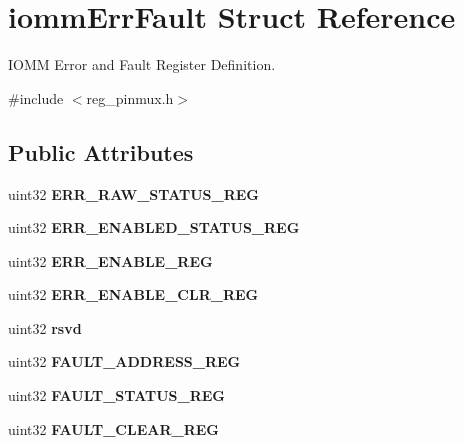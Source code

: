 \hypertarget{structiommErrFault}{}\section{iomm\+Err\+Fault Struct Reference}
\label{structiommErrFault}


I\+O\+MM Error and Fault Register Definition.  




{\ttfamily \#include $<$reg\+\_\+pinmux.\+h$>$}

\subsection*{Public Attributes}
\begin{DoxyCompactItemize}
\item 
\mbox{\label{structiommErrFault_abf315429aa5b04e29527d6069041e141}} 
uint32 {\bfseries E\+R\+R\+\_\+\+R\+A\+W\+\_\+\+S\+T\+A\+T\+U\+S\+\_\+\+R\+EG}
\item 
\mbox{\label{structiommErrFault_aaaf3de961428533b54aad0a52a36121b}} 
uint32 {\bfseries E\+R\+R\+\_\+\+E\+N\+A\+B\+L\+E\+D\+\_\+\+S\+T\+A\+T\+U\+S\+\_\+\+R\+EG}
\item 
\mbox{\label{structiommErrFault_a392dd108a8b01722f27efbcc0e72074b}} 
uint32 {\bfseries E\+R\+R\+\_\+\+E\+N\+A\+B\+L\+E\+\_\+\+R\+EG}
\item 
\mbox{\label{structiommErrFault_a85bbb2c633cff0721f3d6c83cb5c4782}} 
uint32 {\bfseries E\+R\+R\+\_\+\+E\+N\+A\+B\+L\+E\+\_\+\+C\+L\+R\+\_\+\+R\+EG}
\item 
\mbox{\label{structiommErrFault_a294ff5cbec8a64617c2b56a46e917caf}} 
uint32 {\bfseries rsvd}
\item 
\mbox{\label{structiommErrFault_ae4bb796ddace4dc04977764ebe234782}} 
uint32 {\bfseries F\+A\+U\+L\+T\+\_\+\+A\+D\+D\+R\+E\+S\+S\+\_\+\+R\+EG}
\item 
\mbox{\label{structiommErrFault_af234d963ba1ba654b69d698f5e941528}} 
uint32 {\bfseries F\+A\+U\+L\+T\+\_\+\+S\+T\+A\+T\+U\+S\+\_\+\+R\+EG}
\item 
\mbox{\label{structiommErrFault_a076c3104a6b7112fa835c75ff3fc2da2}} 
uint32 {\bfseries F\+A\+U\+L\+T\+\_\+\+C\+L\+E\+A\+R\+\_\+\+R\+EG}
\end{DoxyCompactItemize}


